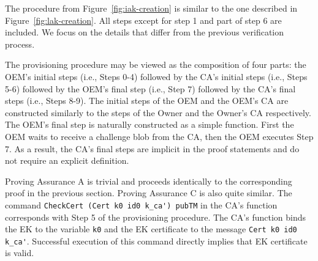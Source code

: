 \documentclass[runningheads]{llncs}
\begin{document}



The procedure from Figure~\ref{fig:iak-creation} is similar to the one
described in Figure~\ref{fig:lak-creation}. All steps except for step 1 and
part of step 6 are included. We focus on the details that differ from
the previous verification process.

The provisioning procedure may be viewed as the composition of four
parts: the OEM's initial steps (i.e., Steps 0-4) followed by the CA's
initial steps (i.e., Steps 5-6) followed by the OEM's final step
(i.e., Step 7) followed by the CA's final steps (i.e., Steps 8-9). The
initial steps of the OEM and the OEM's CA are constructed similarly to
the steps of the Owner and the Owner's CA respectively.  The OEM's
final step is naturally constructed as a simple function. First the
OEM waits to receive a challenge blob from the CA, then the OEM
executes Step 7. As a result, the CA's final steps are implicit in the
proof statements and do not require an explicit definition.

Proving Assurance A is trivial and proceeds identically to the
corresponding proof in the previous section. Proving Assurance C is
also quite similar. The command
\verb|CheckCert (Cert k0 id0 k_ca') pubTM| in the CA's function
corresponds with Step 5 of the provisioning procedure. The CA's
function binds the EK to the variable \verb|k0| and the EK certificate
to the message \verb|Cert k0 id0 k_ca'|.  Successful execution of this
command directly implies that EK certificate is valid.
\end{document}
